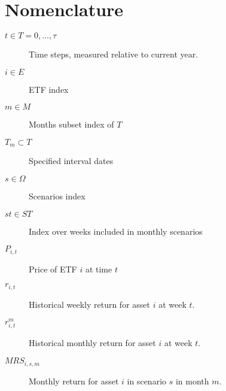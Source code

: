 \section{Nomenclature}
\begin{description}
\item[$t \in T = {0, \ldots, \tau}$]{Time steps, measured relative to current year.}
\item[$i \in E$]{ETF index}
\item[$m \in M$]{Months subset index of $T$}
\item[$T_m \subset T$]{Specified interval dates}
\item[$s \in \Omega$]{Scenarios index}
\item[$st \in ST$]{Index over weeks included in monthly scenarios}
\item[$P_{i,t}$]{Price of ETF $i$ at time $t$}
\item[$r_{i,t}$]{Historical weekly return for asset $i$ at week $t$.}
\item[$r^m_{i,t}$]{Historical monthly return for asset $i$ at week $t$.}
\item[$MRS_{i,s,m}$]{Monthly return for asset $i$ in scenario $s$ in month $m$.}
\end{description}

